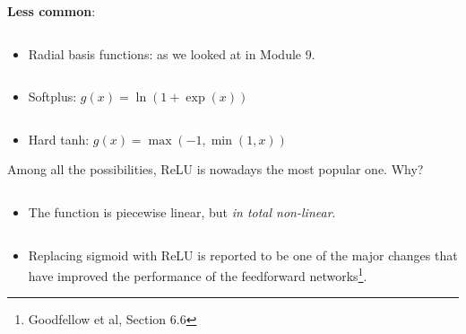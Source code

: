 \documentclass[
  10pt,
  ignorenonframetext,
]{beamer}
\providecommand{\tightlist}{%
  \setlength{\itemsep}{0pt}\setlength{\parskip}{0pt}}
\begin{document}
\begin{frame}
\textbf{Less common}:

\(~\)

\begin{itemize}
\tightlist
\item
  Radial basis functions: as we looked at in Module 9.
\end{itemize}

\(~\)

\begin{itemize}
\tightlist
\item
  Softplus: \(g(x)=\ln(1+\exp(x))\)
\end{itemize}

\(~\)

\begin{itemize}
\tightlist
\item
  Hard tanh: \(g(x)=\max(-1,\min(1,x))\)
\end{itemize}
\end{frame}

\begin{frame}
Among all the possibilities, ReLU is nowadays the most popular one. Why?

\(~\)

\begin{itemize}
\tightlist
\item
  The function is piecewise linear, but \emph{in total non-linear}.
\end{itemize}

\(~\)

\begin{itemize}
\tightlist
\item
  Replacing sigmoid with ReLU is reported to be one of the major changes
  that have improved the performance of the feedforward
  networks\footnote{Goodfellow et al, Section 6.6}.
\end{itemize}
\end{frame}
\end{document}
